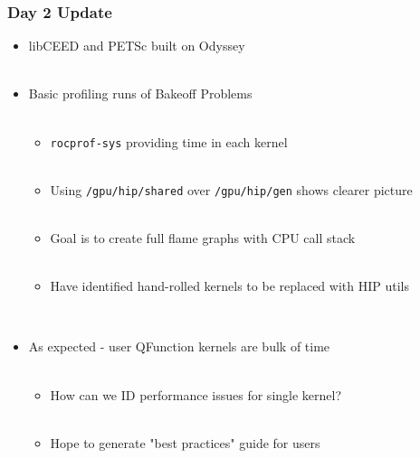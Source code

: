 \documentclass{beamer}
\begin{document}
\begin{frame}
\begin{center}
\frametitle{Day 2 Update}

\begin{itemize}

\item libCEED and PETSc built on Odyssey\\

~\\

\item Basic profiling runs of Bakeoff Problems\\

~\\

\begin{itemize}

\item \lstinline{rocprof-sys} providing time in each kernel\\

~\\

\item Using \lstinline{/gpu/hip/shared} over \lstinline{/gpu/hip/gen} shows clearer picture\\

~\\

\item Goal is to create full flame graphs with CPU call stack\\

~\\

\item Have identified hand-rolled kernels to be replaced with HIP utils\\

\end{itemize}

~\\

\item As expected - user QFunction kernels are bulk of time\\

~\\

\begin{itemize}

\item How can we ID performance issues for single kernel?\\

~\\

\item Hope to generate "best practices" guide for users\\

\end{itemize}

~\\

\end{itemize}

\end{center}
\end{frame}
\end{document}
